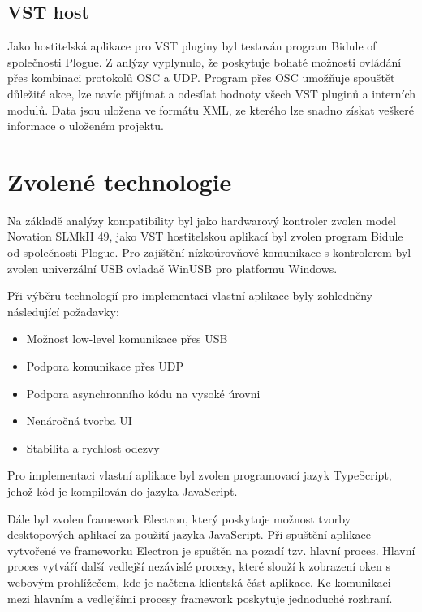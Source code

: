 \documentclass[thesis=M,czech]{FITthesis}[2019/03/06]
\begin{document}
		\subsection{VST host}
		Jako hostitelská aplikace pro VST pluginy byl testován program Bidule of společnosti Plogue.
		Z anlýzy vyplynulo, že poskytuje bohaté možnosti ovládání přes kombinaci protokolů OSC a UDP.
		Program přes OSC umožňuje spouštět důležité akce, lze navíc přijímat a odesílat hodnoty všech VST pluginů a interních modulů.
		Data jsou uložena ve formátu XML, ze kterého lze snadno získat veškeré informace o uloženém projektu.
		
	\section{Zvolené technologie}
		Na základě analýzy kompatibility byl jako hardwarový kontroler zvolen model Novation SLMkII 49, jako VST hostitelskou aplikací byl zvolen program Bidule od společnosti Plogue.
		Pro zajištění nízkoúrovňové komunikace s kontrolerem byl zvolen univerzální USB ovladač WinUSB pro platformu Windows.
	
		Při výběru technologií pro implementaci vlastní aplikace byly zohledněny následující požadavky:
		\begin{itemize}
			\item Možnost low-level komunikace přes USB
			\item Podpora komunikace přes UDP
			\item Podpora asynchronního kódu na vysoké úrovni
			\item Nenáročná tvorba UI
			\item Stabilita a rychlost odezvy
		\end{itemize}
			
		Pro implementaci vlastní aplikace byl zvolen programovací jazyk TypeScript, jehož kód je kompilován do jazyka JavaScript.

		Dále byl zvolen framework Electron, který poskytuje možnost tvorby desktopových aplikací za použití jazyka JavaScript.
		Při spuštění aplikace vytvořené ve frameworku Electron je spuštěn na pozadí tzv. hlavní proces.
		Hlavní proces vytváří další vedlejší nezávislé procesy, které slouží k zobrazení oken s webovým prohlížečem, kde je načtena klientská část aplikace.
		Ke komunikaci mezi hlavním a vedlejšími procesy framework poskytuje jednoduché rozhraní.
\end{document}
